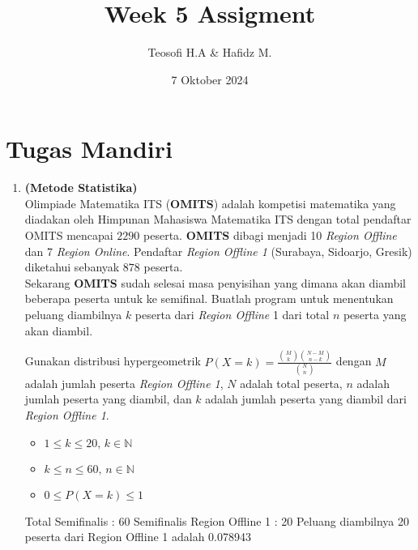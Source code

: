 \documentclass{article}
\title{\textbf{Week 5 Assigment}}
\date{7 Oktober 2024}
\author{Teosofi H.A \& Hafidz M.}
\newcommand{\N}{\mathbb{N}}
\begin{document}
    \maketitle

    \section*{Tugas Mandiri}
    \begin{enumerate}[label=\textbf{\arabic*.}]
        \item \textbf{(Metode Statistika)}\\
        Olimpiade Matematika ITS (\textbf{OMITS}) adalah kompetisi matematika yang diadakan oleh Himpunan Mahasiswa Matematika ITS dengan total pendaftar OMITS mencapai $2290$ peserta. \textbf{OMITS} dibagi menjadi 10 \textit{Region Offline} dan 7 \textit{Region Online}. Pendaftar \textit{Region Offline 1} (Surabaya, Sidoarjo, Gresik) diketahui sebanyak $878$ peserta.\\
        Sekarang \textbf{OMITS} sudah selesai masa penyisihan yang dimana akan diambil beberapa peserta untuk ke semifinal. Buatlah program untuk menentukan peluang diambilnya $k$ peserta dari \textit{Region Offline} 1 dari total $n$ peserta yang akan diambil.
        \begin{hint}
            Gunakan distribusi hypergeometrik $\displaystyle P(X=k) = \frac{\displaystyle\binom{M}{k}\binom{N-M}{n-k}}{\displaystyle\binom{N}{n}}$ dengan $M$ adalah jumlah peserta \textit{Region Offline 1}, $N$ adalah total peserta, $n$ adalah jumlah peserta yang diambil, dan $k$ adalah jumlah peserta yang diambil dari \textit{Region Offline 1}. 
        \end{hint}
        \begin{req}
            \begin{itemize}
                \item $1\leq k\leq 20,\,k\in \N$
                \item $k\leq n\leq 60,\,n\in \N$
            \end{itemize}
        \end{req}
        \begin{out}
            \begin{itemize}
                \item $0\leq P(X=k)\leq 1$
            \end{itemize}
        \end{out}
        \begin{RunCode}
Total Semifinalis : 60
Semifinalis Region Offline 1 : 20
Peluang diambilnya 20 peserta dari Region Offline 1 adalah 0.078943
        \end{RunCode}
            

\end{enumerate}
\end{document}
